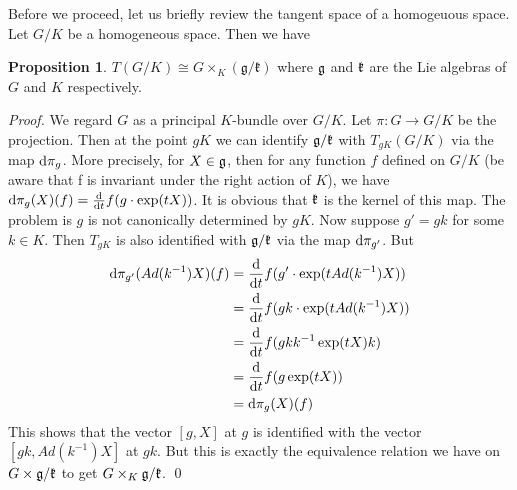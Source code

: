 \documentclass[aspectratio=169, 10pt]{beamer}
\theoremstyle{definition}
\theoremstyle{example}
\newtheorem{proposition}[theorem]{Proposition}
\begin{document}
	\begin{frame}[allowframebreaks]
		Before we proceed, let us briefly review the tangent space of a homogeuous space. Let $G/K$ be a homogeneous space. Then we have
		\begin{proposition}
			$T(G/K)\cong G\times_K (\mathfrak{g}/\mathfrak{k})$ where $\mathfrak{g}$ and $\mathfrak{k}$ are the Lie algebras of $G$ and $K$ respectively.
		\end{proposition}
		\noindent \textit{Proof.} 
			We regard $G$ as a principal $K$-bundle over $G/K$. Let $\pi: G\to G/K$ be the projection. Then at the point $gK$ we can identify $\mathfrak{g}/\mathfrak{k}$ with $T_{gK}(G/K)$ via the map $\mathop{}\!\mathrm{d}\pi_{g}$. More precisely, for $X\in \mathfrak{g}$, then for any function $f$ defined on $G/K$ (be aware that f is invariant under the right action of $K$), we have $\mathop{}\!\mathrm{d}\pi_g(X)(f)=\frac{\mathop{}\!\mathrm{d}}{\mathop{}\!\mathrm{d} t}f(g\cdot\exp(tX))$.
			It is obvious that $\mathfrak{k}$ is the kernel of this map. The problem is $g$ is not canonically determined by $gK$. Now suppose $g'=gk$ for some $k\in K$. Then $T_{gK}$ is also identified with $\mathfrak{g}/\mathfrak{k}$ via the map $\mathop{}\!\mathrm{d} \pi_{g'}$. But 
			\begin{align*}
				\diff \pi_{g'}(Ad(k^{-1})X)(f)&=\frac{\diff}{\diff t}f(g'\cdot\exp(tAd(k^{-1})X))\\
				&=\frac{\diff}{\diff t}f(gk\cdot\exp(tAd(k^{-1})X))\\
				&=\frac{\diff}{\diff t}f(gkk^{-1}\exp(tX)k)\\
				&=\frac{\diff}{\diff t}f(g\exp(tX))\\
				&=\diff \pi_g(X)(f)
			\end{align*}
			This shows that the vector $[g,X]$ at $g$ is identified with the vector $[gk,Ad(k^{-1})X]$ at $gk$. But this is exactly the equivalence relation we have on $G\times \mathfrak{g}/\mathfrak{k}$ to get $G\times_K \mathfrak{g}/\mathfrak{k}$. \hfill \qed
	\end{frame}
\end{document}
